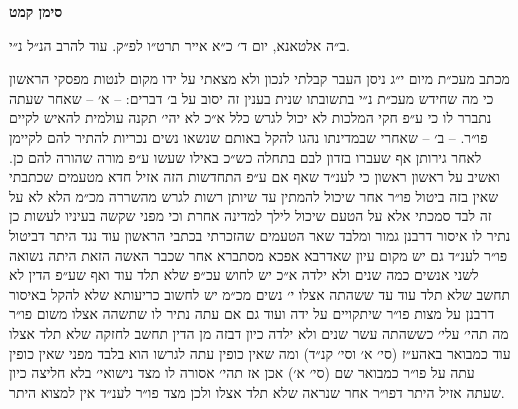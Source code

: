 \documentclass[12pt, openany]{book}
\newcommand{\chapname}{}
\newcommand{\newchap}[1]{
	\addcontentsline{toc}{chapter}{#1}
	\renewcommand{\chapname}{#1}
		\begin{center}
			\textbf{%
\fontsize{16pt}{16pt}\selectfont
				#1}
		\end{center}
}
\begin{document}
\newchap{סימן קמט}
\begin{multicols}{2}
ב״ה אלטאנא, יום ד׳ כ״א אייר תרט״ו לפ״ק. עוד להרב הנ״ל נ״י.\\\vspace{0pt}

מכתב מעכ״ת מיום י״ג ניסן העבר קבלתי לנכון ולא מצאתי על ידו מקום לנטות מפסקי הראשון כי מה שחידש מעכ״ת נ״י בתשובתו שנית בענין זה יסוב על ב׳ דברים: – א׳ – שאחר שעתה נתברר לו כי ע״פ חקי המלכות לא יכול לגרש כלל א״כ לא יהי׳ תקנה עולמית להאיש לקיים פו״ר. – ב׳ – שאחרי שבמדינתו נהגו להקל באותם שנשאו נשים נכריות להתיר להם לקיימן לאחר גירותן אף שעברו בזדון לבם בתחלה כש״כ באילו שעשו ע״פ מורה שהורה להם כן. ואשיב על ראשון ראשון כי לענ״ד שאף אם ע״פ התחדשות הזה אזיל חדא מטעמים שכתבתי שאין בזה ביטול פו״ר אחר שיכול להמתין עד שיותן רשות לגרש מהשררה מכ״מ הלא לא על זה לבד סמכתי אלא על הטעם שיכול לילך למדינה אחרת וכי מפני שקשה בעיניו לעשות כן נתיר לו איסור דרבנן גמור ומלבד שאר הטעמים שהזכרתי בכתבי הראשון עוד נגד היתר דביטול פו״ר לענ״ד גם יש מקום עיון שאדרבא אפכא מסתברא אחר שכבר האשה הזאת היתה נשואה לשני אנשים כמה שנים ולא ילדה א״כ יש לחוש עכ״פ שלא תלד עוד ואף שע״פ הדין לא תחשב שלא תלד עוד עד ששהתה אצלו י׳ נשים מכ״מ יש לחשוב כריעותא שלא להקל באיסור דרבנן על מצות פו״ר שיתקויים על ידה ועוד גם אם עתה נתיר לו שתשהה אצלו משום פו״ר מה תהי׳ עלי׳ כששהתה עשר שנים ולא ילדה כיון דבזה מן הדין תחשב לחזקה שלא תלד אצלו עוד כמבואר באהע״ז (סי׳ א׳ וסי׳ קנ״ד) ומה שאין כופין עתה לגרשו הוא בלבד מפני שאין כופין עתה על פו״ר כמבואר שם (סי׳ א׳) אכן אז תהי׳ אסורה לו מצד נישואי׳ בלא חליצה כיון שעתה אזיל היתר דפו״ר אחר שנראה שלא תלד אצלו ולכן מצד פו״ר לענ״ד אין למצוא היתר.\\\vspace{0pt}


\end{multicols}
\end{document}
